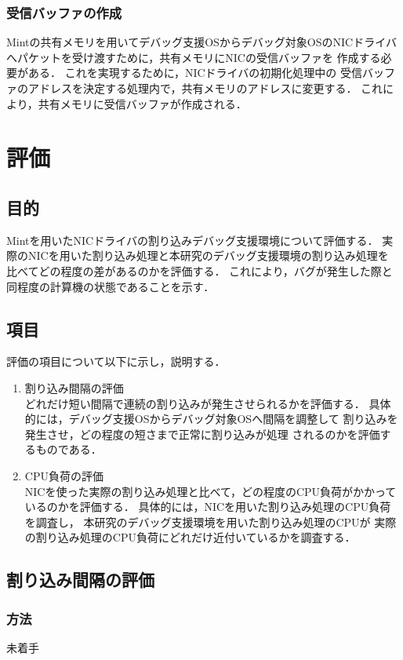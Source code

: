 \documentclass[tanilab-enum]{graduate}
\begin{document}
\subsection{受信バッファの作成}
Mintの共有メモリを用いてデバッグ支援OSからデバッグ対象OSのNICドライバ
へパケットを受け渡すために，共有メモリにNICの受信バッファを
作成する必要がある．
これを実現するために，NICドライバの初期化処理中の
受信バッファのアドレスを決定する処理内で，共有メモリのアドレスに変更する．
これにより，共有メモリに受信バッファが作成される．
\chapter{評価}\label{estimaion}
\section{目的}
Mintを用いたNICドライバの割り込みデバッグ支援環境について評価する．
実際のNICを用いた割り込み処理と本研究のデバッグ支援環境の割り込み処理を
比べてどの程度の差があるのかを評価する．
これにより，バグが発生した際と同程度の計算機の状態であることを示す．
\section{項目}
評価の項目について以下に示し，説明する．
\begin{enumerate}
    \item 割り込み間隔の評価\\
        どれだけ短い間隔で連続の割り込みが発生させられるかを評価する．
        具体的には，デバッグ支援OSからデバッグ対象OSへ間隔を調整して
        割り込みを発生させ，どの程度の短さまで正常に割り込みが処理
        されるのかを評価するものである．
    \item CPU負荷の評価\\
        NICを使った実際の割り込み処理と比べて，どの程度のCPU負荷がかかって
        いるのかを評価する．
        具体的には，NICを用いた割り込み処理のCPU負荷を調査し，
        本研究のデバッグ支援環境を用いた割り込み処理のCPUが
        実際の割り込み処理のCPU負荷にどれだけ近付いているかを調査する．
\end{enumerate}
\section{割り込み間隔の評価}
    \subsection{方法}
    未着手
\end{document}
